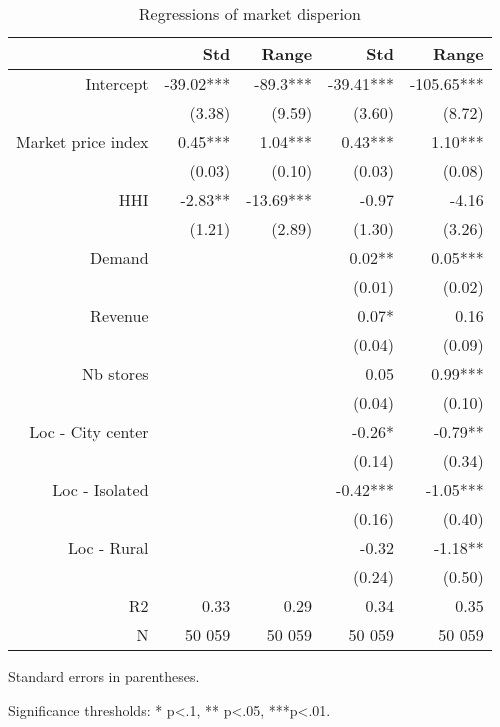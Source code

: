 \documentclass[english]{article}
\begin{document}
\begin{table}
\caption{Regressions of market disperion}
\label{tab:reg_market_dispersion}
\begin{threeparttable}
\begin{tabular}{rrrrr}
\toprule
\toprule
      & Std   & Range & Std   & Range \\
\midrule
Intercept & -39.02*** & -89.3*** & -39.41*** & -105.65*** \\
      & (3.38) & (9.59) & (3.60) & (8.72) \\
Market price index & 0.45*** & 1.04*** & 0.43*** & 1.10*** \\
      & (0.03) & (0.10) & (0.03) & (0.08) \\
HHI   & -2.83** & -13.69*** & -0.97 & -4.16 \\
      & (1.21) & (2.89) & (1.30) & (3.26) \\
Demand &       &       & 0.02** & 0.05*** \\
      &       &       & (0.01) & (0.02) \\
Revenue &       &       & 0.07* & 0.16 \\
      &       &       & (0.04) & (0.09) \\
Nb stores &       &       & 0.05  & 0.99*** \\
      &       &       & (0.04) & (0.10) \\
Loc - City center &       &       & -0.26* & -0.79** \\
      &       &       & (0.14) & (0.34) \\
Loc - Isolated &       &       & -0.42*** & -1.05*** \\
      &       &       & (0.16) & (0.40) \\
Loc - Rural &       &       & -0.32 & -1.18** \\
      &       &       & (0.24) & (0.50) \\
R2    & 0.33  & 0.29  & 0.34  & 0.35 \\
N     & 50 059 & 50 059 & 50 059 & 50 059 \\
\bottomrule
\bottomrule
\end{tabular}
\begin{tablenotes}
      \small
	  \item Standard errors in parentheses.
		\item Significance thresholds: * p<.1, ** p<.05, ***p<.01.
\end{tablenotes}
\end{threeparttable}
\end{table}
\end{document}
